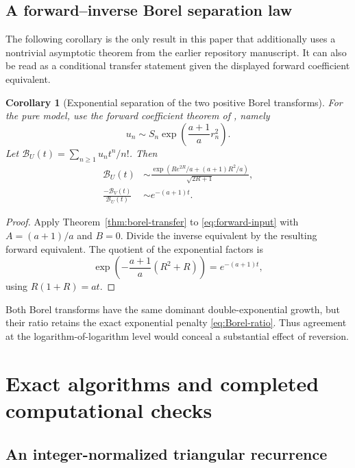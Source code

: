 \documentclass[11pt,a4paper]{article}
\numberwithin{equation}{section}
\newtheorem{corollary}[theorem]{Corollary}
\theoremstyle{definition}
\theoremstyle{remark}
\newcommand{\Bcal}{\mathcal B}\newcommand{\Ccal}{\mathcal C}
\begin{document}
\subsection{A forward--inverse Borel separation law}

The following corollary is the only result in this paper that additionally
uses a nontrivial asymptotic theorem from the earlier repository manuscript.
It can also be read as a conditional transfer statement given the displayed
forward coefficient equivalent.

\begin{corollary}[Exponential separation of the two positive Borel transforms]
\label{cor:Borel-ratio}
For the pure model, use the forward coefficient theorem of
\cite{finitecore}, namely
\begin{equation}
 u_n\sim S_n\exp\!\left(\frac{a+1}{a}r_n^2\right).
 \label{eq:forward-input}
\end{equation}
Let $\Bcal_U(t)=\sum_{n\ge1}u_nt^n/n!$. Then
\begin{align}
 \Bcal_U(t)&\sim
 \frac{\exp\!\left(R e^{2R}/a+(a+1)R^2/a\right)}{\sqrt{2R+1}},
 \label{eq:Borel-forward}\\
 \frac{-\Bcal_V(t)}{\Bcal_U(t)}&\sim e^{-(a+1)t}.
 \label{eq:Borel-ratio}
\end{align}
\end{corollary}

\begin{proof}
Apply Theorem~\ref{thm:borel-transfer} to \eqref{eq:forward-input} with
$A=(a+1)/a$ and $B=0$. Divide the inverse equivalent by the resulting
forward equivalent. The quotient of the exponential factors is
\[
 \exp\!\left(-\frac{a+1}{a}(R^2+R)\right)=e^{-(a+1)t},
\]
using $R(1+R)=at$.
\end{proof}

Both Borel transforms have the same dominant double-exponential growth,
but their ratio retains the exact exponential penalty
\eqref{eq:Borel-ratio}. Thus agreement at the logarithm-of-logarithm level
would conceal a substantial effect of reversion.

\section{Exact algorithms and completed computational checks}
\label{sec:checks}

\subsection{An integer-normalized triangular recurrence}
\end{document}
